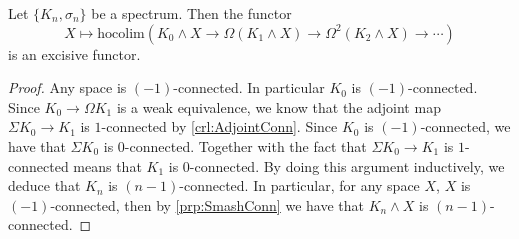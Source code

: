 \begin{prp}\label{prp:WedgeSpecExcisive} Let $\{K_n,\sigma_n\}$ be a spectrum. Then the functor $$X\mapsto\text{hocolim}(K_0\wedge X\rightarrow\Omega(K_1\wedge X)\rightarrow\Omega^2(K_2\wedge X)\rightarrow\cdots)$$ is an excisive functor. 
\begin{proof}
Any space is $(-1)$-connected. In particular $K_0$ is $(-1)$-connected. Since $K_0\to\Omega K_1$ is a weak equivalence, we know that the adjoint map $\Sigma K_0\to K_1$ is $1$-connected by \ref{crl:AdjointConn}. Since $K_0$ is $(-1)$-connected, we have that $\Sigma K_0$ is $0$-connected. Together with the fact that $\Sigma K_0\to K_1$ is $1$-connected means that $K_1$ is $0$-connected. By doing this argument inductively, we deduce that $K_n$ is $(n-1)$-connected. In particular, for any space $X$, $X$ is $(-1)$-connected, then by \ref{prp:SmashConn} we have that $K_n\wedge X$ is $(n-1)$-connected.  


\end{proof}
\end{prp}
